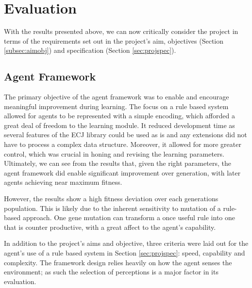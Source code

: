 
\section{Evaluation}

With the results presented above, we can now critically consider the project in terms of the requirements set out in the project's aim, objectives (Section \ref{subsec:aimobj}) and specification (Section \ref{sec:projspec}).


\subsection{Agent Framework}

The primary objective of the agent framework was to enable and encourage meaningful improvement during learning. The focus on a rule based system allowed for agents to be represented with a simple encoding, which afforded a great deal of freedom to the learning module. It reduced development time as several features of the ECJ library could be used as is and any extensions did not have to process a complex data structure. Moreover, it allowed for more greater control, which was crucial in honing and revising the learning parameters. Ultimately, we can see from the results that, given the right parameters, the agent framework did enable significant improvement over generation, with later agents achieving near maximum fitness.

However, the results show a high fitness deviation over each generations population. This is likely due to the inherent sensitivity to mutation of a rule-based approach. One gene mutation can transform a once useful rule into one that is counter productive, with a great affect to the agent's capability.

In addition to the project's aims and objective, three criteria were laid out for the agent's use of a rule based system in Section \ref{sec:projspec}: speed, capability and complexity. The framework design relies heavily on how the agent senses the environment; as such the selection of perceptions is a major factor in its evaluation.

